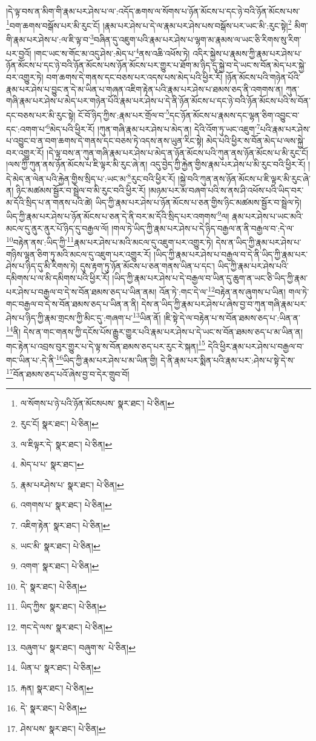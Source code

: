 །དེ་ལྟ་བས་ན་མིག་གི་རྣམ་པར་ཤེས་པ་ལ་:འདོད་ཆགས་ལ་སོགས་པ་ཉོན་མོངས་པ་དང་ཉེ་བའི་ཉོན་མོངས་པས་\footnote{ལ་སོགས་པ་ཉེ་པའི་ཉོན་མོངསཔས་  སྣར་ཐང་།  པེ་ཅིན། }བག་ཆགས་བསྒོས་པར་མི་རུང་ངོ། །རྣམ་པར་ཤེས་པ་དེ་ལ་རྣམ་པར་ཤེས་པས་བསྒོས་པར་ཡང་མི་:རུང་སྟེ།\footnote{རུང་ངོ།  སྣར་ཐང་།  པེ་ཅིན། } མིག་གི་རྣམ་པར་ཤེས་པ་:ལ་ཇི་ལྟ་བ་\footnote{ལ་ཇིལྟར་དེ་  སྣར་ཐང་།  པེ་ཅིན། }བཞིན་དུ་འཇུག་པའི་རྣམ་པར་ཤེས་པ་ལྷག་མ་རྣམས་ལ་ཡང་ཅི་རིགས་སུ་རིག་པར་བྱའོ། །གང་ཡང་ས་གོང་མ་འདུ་ཤེས་:མེད་པ་\footnote{མེད་པ་པ་  སྣར་ཐང་། }ནས་འཆི་འཕོས་ཏེ། འདིར་སྐྱེས་པ་རྣམས་ཀྱི་རྣམ་པར་ཤེས་པ་ཉོན་མོངས་པ་དང་ཉེ་བའི་ཉོན་མོངས་པས་ཉོན་མོངས་པར་གྱུར་པ་ཐོག་མ་ཉིད་དུ་སྐྱེ་བ་དེ་ཡང་ས་བོན་མེད་པར་སྐྱེ་བར་འགྱུར་ཏེ། བག་ཆགས་དེ་གནས་དང་བཅས་པར་འདས་པས་མེད་པའི་ཕྱིར་རོ། །ཉོན་མོངས་པའི་གཉེན་པོའི་རྣམ་པར་ཤེས་པ་བྱུང་ན་དེ་མ་ཡིན་པ་གཞན་འཇིག་རྟེན་པའི་རྣམ་པར་ཤེས་པ་ཐམས་ཅད་ནི་འགགས་ན། ཀུན་གཞི་རྣམ་པར་ཤེས་པ་མེད་པར་གཉེན་པོའི་རྣམ་པར་ཤེས་པ་དེ་ནི་ཉོན་མོངས་པ་དང་ཉེ་བའི་ཉོན་མོངས་པའི་ས་བོན་དང་བཅས་པར་མི་རུང་སྟེ། ངོ་བོ་ཉིད་ཀྱིས་:རྣམ་པར་གྲོལ་བ་\footnote{རྣམ་པརཤེས་པ་  སྣར་ཐང་།  པེ་ཅིན། }དང་ཉོན་མོངས་པ་རྣམས་དང་ལྷན་ཅིག་འབྱུང་བ་དང་:འགག་པ་\footnote{འགགས་པ་  སྣར་ཐང་།  པེ་ཅིན། }མེད་པའི་ཕྱིར་རོ། །ཀུན་གཞི་རྣམ་པར་ཤེས་པ་མེད་ན། དེའི་འོག་ཏུ་ཡང་འཇུག་\footnote{འཇིག་རྟེན་  སྣར་ཐང་།  པེ་ཅིན། }པའི་རྣམ་པར་ཤེས་པ་འབྱུང་བ་ན་བག་ཆགས་དེ་གནས་དང་བཅས་ཏེ་འདས་ནས་ཡུན་རིང་སྟེ། མེད་པའི་ཕྱིར་ས་བོན་མེད་པ་ལས་སྐྱེ་བར་འགྱུར་རོ། །དེ་ལྟ་བས་ན་ཀུན་གཞི་རྣམ་པར་ཤེས་པ་མེད་ན་ཉོན་མོངས་པའི་ཀུན་ནས་ཉོན་མོངས་པ་མི་རུང་ངོ། །ལས་ཀྱི་ཀུན་ནས་ཉོན་མོངས་པ་ཇི་ལྟར་མི་རུང་ཞེ་ན། འདུ་བྱེད་ཀྱི་རྐྱེན་གྱིས་རྣམ་པར་ཤེས་པ་མི་རུང་བའི་ཕྱིར་རོ། །དེ་མེད་ན་ལེན་པའི་རྐྱེན་གྱིས་སྲིད་པ་:ཡང་མ་\footnote{ཡང་མི་  སྣར་ཐང་།  པེ་ཅིན། }རུང་བའི་ཕྱིར་རོ། །སྐྱེ་བའི་ཀུན་ནས་ཉོན་མོངས་པ་ཇི་ལྟར་མི་རུང་ཞེ་ན། ཉིང་མཚམས་སྦྱོར་བ་སྦྲེལ་བ་མི་རུང་བའི་ཕྱིར་རོ། །མཉམ་པར་མ་བཞག་པའི་ས་ནས་ཤི་འཕོས་པའི་ཡིད་བར་མ་དོའི་སྲིད་པ་ན་གནས་པའི་ཚེ། ཡིད་ཀྱི་རྣམ་པར་ཤེས་པ་ཉོན་མོངས་པ་ཅན་གྱིས་ཉིང་མཚམས་སྦྱོར་བ་སྦྲེལ་ཏེ། ཡིད་ཀྱི་རྣམ་པར་ཤེས་པ་ཉོན་མོངས་པ་ཅན་དེ་ནི་བར་མ་དོའི་སྲིད་པར་འགགས་\footnote{འགག་  སྣར་ཐང་།  པེ་ཅིན། }ལ། རྣམ་པར་ཤེས་པ་ཡང་མའི་མངལ་དུ་ནུར་ནུར་པོ་ཉིད་དུ་བརྒྱལ་ལོ། །གལ་ཏེ་ཡིད་ཀྱི་རྣམ་པར་ཤེས་པ་དེ་ཉིད་བརྒྱལ་ན་ནི་བརྒྱལ་བ་:དེ་ལ་\footnote{དེ་  སྣར་ཐང་།  པེ་ཅིན། }བརྟེན་ནས་:ཡིད་ཀྱི་\footnote{ཡིད་ཀྱིས་  སྣར་ཐང་།  པེ་ཅིན། }རྣམ་པར་ཤེས་པ་མའི་མངལ་དུ་འཇུག་པར་འགྱུར་ཏེ། དེས་ན་ཡིད་ཀྱི་རྣམ་པར་ཤེས་པ་གཉིས་ལྷན་ཅིག་ཏུ་མའི་མངལ་དུ་འཇུག་པར་འགྱུར་རོ། །ཡིད་ཀྱི་རྣམ་པར་ཤེས་པ་བརྒྱལ་བ་དེ་ནི་ཡིད་ཀྱི་རྣམ་པར་ཤེས་པ་ཉིད་དུ་མི་རིགས་ཏེ། དུས་རྟག་ཏུ་ཉོན་མོངས་པ་ཅན་གནས་ཡིན་པ་དང་། ཡིད་ཀྱི་རྣམ་པར་ཤེས་པའི་དམིགས་པ་ལ་མི་དམིགས་པའི་ཕྱིར་རོ། །ཡིད་ཀྱི་རྣམ་པར་ཤེས་པ་དེ་བརྒྱལ་བ་ཡིན་དུ་ཆུག་ན་ཡང་ཅི་ཡིད་ཀྱི་རྣམ་པར་ཤེས་པ་བརྒྱལ་བ་དེ་ས་བོན་ཐམས་ཅད་པ་ཡིན་ནམ། འོན་ཏེ་:གང་དེ་ལ་\footnote{གང་དེ་ལས་  སྣར་ཐང་།  པེ་ཅིན། }བརྟེན་ནས་ཞུགས་པ་ཡིན། གལ་ཏེ་གང་བརྒྱལ་བ་དེ་ས་བོན་ཐམས་ཅད་པ་ཡིན་ན་ནི། དེས་ན་ཡིད་ཀྱི་རྣམ་པར་ཤེས་པ་ཞེས་བྱ་བ་ཀུན་གཞི་རྣམ་པར་ཤེས་པ་ཉིད་ཀྱི་རྣམ་གྲངས་ཀྱི་མིང་དུ་:གཞག་པ་\footnote{བཞུག་པ་  སྣར་ཐང་། བཞུག་ས་  པེ་ཅིན། }ཡིན་ནོ། །ཇི་སྟེ་དེ་ལ་བརྟེན་པ་ས་བོན་ཐམས་ཅད་པ་:ཡིན་ན་\footnote{ཡིན་པ་  སྣར་ཐང་།  པེ་ཅིན། }ནི། དེས་ན་གང་གནས་ཀྱི་དངོས་པོས་རྒྱུར་གྱུར་པའི་རྣམ་པར་ཤེས་པ་དེ་ཡང་ས་བོན་ཐམས་ཅད་པ་མ་ཡིན་ན། གང་རྟེན་པ་འབྲས་བུར་གྱུར་པ་དེ་ལྟ་ས་བོན་ཐམས་ཅད་པར་རུང་རེ་སྐན།\footnote{རྐན།  སྣར་ཐང་།  པེ་ཅིན། } དེའི་ཕྱིར་རྣམ་པར་ཤེས་པ་བརྒྱལ་བ་གང་ཡིན་པ་:དེ་ནི་\footnote{དེ་  སྣར་ཐང་།  པེ་ཅིན། }ཡིད་ཀྱི་རྣམ་པར་ཤེས་པ་མ་ཡིན་གྱི། དེ་ནི་རྣམ་པར་སྨིན་པའི་རྣམ་པར་:ཤེས་པ་སྟེ་དེ་ས་\footnote{ཤེས་པས་  སྣར་ཐང་།  པེ་ཅིན། }བོན་ཐམས་ཅད་པའོ་ཞེས་བྱ་བ་དེར་གྲུབ་བོ། 